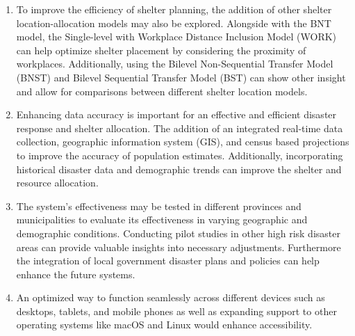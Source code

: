 	\begin{enumerate}
		\item To improve the efficiency of shelter planning, the addition of other shelter location-allocation models may also be explored. Alongside with the BNT model, the Single-level with Workplace Distance Inclusion Model (WORK) can help optimize shelter placement by considering the proximity of workplaces. Additionally, using the Bilevel Non-Sequential Transfer Model (BNST) and Bilevel Sequential Transfer Model (BST) can show other insight and allow for comparisons between different shelter location models.
		\item Enhancing data accuracy is important for an effective and efficient disaster response and shelter allocation. The addition of an integrated real-time data collection, geographic information system (GIS), and census based projections to improve the accuracy of population estimates. Additionally, incorporating historical disaster data and demographic trends can improve the shelter and resource allocation.
		\item The system’s effectiveness may be tested in different provinces and municipalities to evaluate its effectiveness in varying geographic and demographic conditions. Conducting pilot studies in other high risk disaster areas can provide valuable insights into necessary adjustments. Furthermore the integration of local government disaster plans and policies can help enhance the future systems.
		\item An optimized way to function seamlessly across different devices such as desktops, tablets, and mobile phones as well as expanding support to other operating systems like macOS and Linux would enhance accessibility.
	\end{enumerate}
	